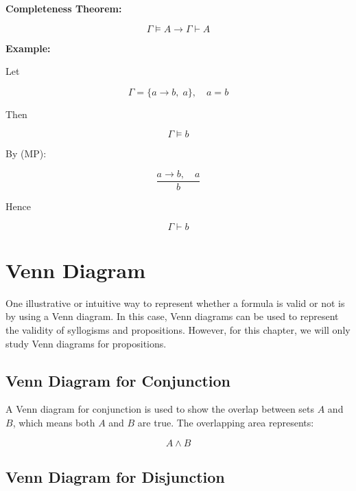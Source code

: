 \documentclass[12pt,a4paper,openany]{article}
\begin{document}
\textbf{Completeness Theorem:}

\[
\Gamma \models A \to \Gamma \vdash A
\]

\textbf{Example:}  

Let

\[
\Gamma = \{a \to b, \; a\}, \quad a = b
\]

Then

\[
\Gamma \models b
\]

By (MP):

\[
\frac{a \to b, \quad a}{b}
\]

Hence

\[
\Gamma \vdash b
\]


\section{Venn Diagram}

One illustrative or intuitive way to represent whether a formula is valid or not is by using a Venn diagram. In this case, Venn diagrams can be used to represent the validity of syllogisms and propositions. However, for this chapter, we will only study Venn diagrams for propositions.

\subsection{Venn Diagram for Conjunction}\label{ven-diagram-for-conjunction}

A Venn diagram for conjunction is used to show the overlap between sets \(A\) and \(B\), which means both \(A\) and \(B\) are true. The overlapping area represents:

\[
A \wedge B
\]

\begin{center}
\end{center}

\subsection{Venn Diagram for Disjunction}\label{venn-diagram-for-disjunction}
\end{document}
